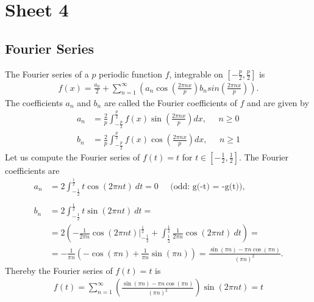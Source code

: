 


\maketitle
\tableofcontents

\section{Sheet 4}

\subsection{Fourier Series}
The Fourier series of a $p$ periodic function $f$, integrable on
$[-\frac{p}{2}, \frac{p}{2}]$ is
\begin{align}
    f(x) = \frac{a_0}{2} + \sum_{n=1}^\infty \left(a_n \cos(\frac{2\pi n x}{p})
    b_n sin(\frac{2\pi n x}{p})\right).
\end{align}
The coefficients $a_n$ and $b_n$ are called the Fourier coefficients of $f$
and are given by
\begin{align}
    a_n &= \frac{2}{p} \int_{-\frac{p}{2}}^{\frac{p}{2}} f(x) \sin(\frac{2\pi
    n x}{p}) dx, \;\;\;\;\; n\geq 0 \\
    b_n &= \frac{2}{p} \int_{-\frac{p}{2}}^{\frac{p}{2}} f(x) \cos(\frac{2\pi
    n x}{p}) dx, \;\;\;\;\; n\geq 1
\end{align}
Let us compute the Fourier series of $f(t) = t$ for $t \in [-\frac{1}{2},
\frac{1}{2}]$. The Fourier coefficients are
\begin{align}
    a_n &= 2\int_{-\frac{1}{2}}^{\frac{1}{2}} t \cos(2\pi n t)\ dt = 0
    \;\;\;\;\; \text{(odd: g(-t) = -g(t))},\\
    \nonumber\\
    b_n &= 2\int_{-\frac{1}{2}}^{\frac{1}{2}} t \sin(2\pi n t)\ dt = \\
        &= 2 \left(-\frac{1}{2\pi n} \cos(2\pi n
        t)\bigg|_{-\frac{1}{2}}^{\frac{1}{2}}
        +\int_{\frac{1}{2}}^{\frac{1}{2}} \frac{1}{2 \pi n}\cos(2\pi n t)\ dt
            \right) =\\
        &= -\frac{1}{\pi n}\left( -\cos(\pi n) + \frac{1}{\pi n }\sin(\pi
            n)\right) =
        \frac{\sin(\pi n) - \pi n \cos(\pi n)}{(\pi n)^2}.
\end{align}
Thereby the Fourier series of $f(t) = t$ is
\begin{align}
    f(t) = \sum_{n=1}^\infty \left(\frac{\sin(\pi n) - \pi n \cos(\pi n)}{(\pi
    n)^2}\right) \sin(2\pi n t) = t
\end{align}
